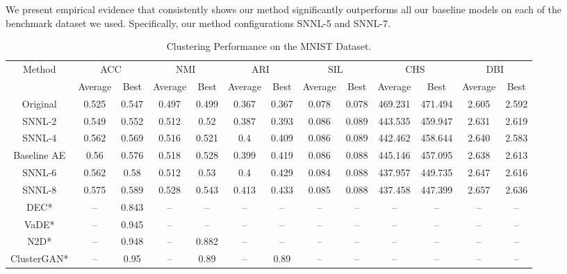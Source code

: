 \documentclass[conference]{IEEEtran}
\begin{document}
We present empirical evidence that consistently shows our method significantly outperforms all our baseline models on each of the benchmark dataset we used. Specifically, our method configurations SNNL-5 and SNNL-7.
\begin{table*}[htb]
    \caption{Clustering Performance on the MNIST Dataset.}
    \label{tab:mnist_clustering_performance_latent_code}
    \centering
    \begin{tabular}{| *{13}{c|}}
        \hline
         \multirow{2}{*}{Method} & \multicolumn{2}{c|}{ACC} & \multicolumn{2}{c|}{NMI} & \multicolumn{2}{c|}{ARI} & \multicolumn{2}{c|}{SIL} & \multicolumn{2}{c|}{CHS} & \multicolumn{2}{c|}{DBI}\\
         \cline{2-13}
         & Average & Best & Average & Best & Average & Best & Average & Best & Average & Best & Average & Best \\ 
         \hline
         Original & 0.525 & 0.547 & 0.497 & 0.499 & 0.367 & 0.367 & 0.078 & 0.078 & 469.231 & 471.494 & 2.605 & 2.592\\
         \hline
         SNNL-2 & 0.549 & 0.552 & 0.512 & 0.52 & 0.387 & 0.393 & 0.086 & 0.089 & 443.535 & 459.947 & 2.631 & 2.619\\
         \hline
         SNNL-4 & 0.562 & 0.569 & 0.516 & 0.521 & 0.4 & 0.409 & 0.086 & 0.089 & 442.462 & 458.644 & 2.640 & 2.583\\
         \hline
         Baseline AE & 0.56 & 0.576 & 0.518 & 0.528 & 0.399 & 0.419 & 0.086 & 0.088 & 445.146 & 457.095 & 2.638 & 2.613\\
         \hline
         SNNL-6 & 0.562 & 0.58 & 0.512 & 0.53 & 0.4 & 0.429 & 0.084 & 0.088 & 437.957 & 449.735 & 2.647 & 2.616\\
         \hline
         SNNL-8 & 0.575 & 0.589 & 0.528 & 0.543 & 0.413 & 0.433 & 0.085 & 0.088 & 437.458 & 447.399 & 2.657 & 2.636\\
         \hline
         DEC\cite{xie2016unsupervised}* & -- & 0.843 & -- & -- & -- & -- & -- & -- & -- & -- & -- & --\\
         \hline
         VaDE\cite{jiang2016variational}* & -- & 0.945 & -- & -- & -- & -- & -- & -- & -- & -- & -- & --\\
         \hline
         N2D\cite{mcconville2019n2d}* & -- & 0.948 & -- & 0.882 & -- & -- & -- & -- & -- & -- & -- & --\\
         \hline
         ClusterGAN\cite{mukherjee2019clustergan}* & -- & 0.95 & -- & 0.89 & -- & 0.89 & -- & -- & -- & -- & -- & --\\

\end{tabular}
\end{table*}
\end{document}
